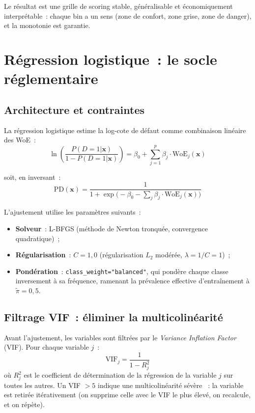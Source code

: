 \documentclass[12pt, a4paper, twoside, openright]{report}
\theoremstyle{definition}
\begin{document}
Le résultat est une grille de scoring stable, généralisable et économiquement interprétable~: chaque bin a un sens (zone de confort, zone grise, zone de danger), et la monotonie est garantie.

\section{Régression logistique~: le socle réglementaire}
\label{sec:pd:lr}

\subsection{Architecture et contraintes}

La régression logistique estime la log-cote de défaut comme combinaison linéaire des WoE~:
\begin{equation}
\ln\!\left(\frac{P(D=1|\mathbf{x})}{1 - P(D=1|\mathbf{x})}\right) = \beta_0 + \sum_{j=1}^{p} \beta_j \cdot \text{WoE}_j(\mathbf{x})
\label{eq:lr}
\end{equation}

\noindent soit, en inversant~:
\begin{equation}
\text{PD}(\mathbf{x}) = \frac{1}{1 + \exp\!\bigl(-\beta_0 - \sum_j \beta_j \cdot \text{WoE}_j(\mathbf{x})\bigr)}
\label{eq:pd-lr}
\end{equation}

L'ajustement utilise les paramètres suivants~:
\begin{itemize}[nosep]
  \item \textbf{Solveur}~: L-BFGS (méthode de Newton tronquée, convergence quadratique)~;
  \item \textbf{Régularisation}~: $C = 1{,}0$ (régularisation $L_2$ modérée, $\lambda = 1/C = 1$)~;
  \item \textbf{Pondération}~: \texttt{class\_weight="balanced"}, qui pondère chaque classe inversement à sa fréquence, ramenant la prévalence effective d'entraînement à $\tilde{\pi} = 0{,}5$.
\end{itemize}

\subsection{Filtrage VIF~: éliminer la multicolinéarité}

Avant l'ajustement, les variables sont filtrées par le \emph{Variance Inflation Factor} (VIF). Pour chaque variable $j$~:
\begin{equation}
\text{VIF}_j = \frac{1}{1 - R^2_j}
\label{eq:vif}
\end{equation}
où $R^2_j$ est le coefficient de détermination de la régression de la variable $j$ sur toutes les autres. Un VIF $> 5$ indique une multicolinéarité sévère \citep{marquardt1970}~: la variable est retirée itérativement (on supprime celle avec le VIF le plus élevé, on recalcule, et on répète).
\end{document}
